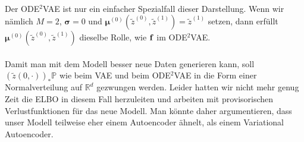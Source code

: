 \documentclass[12pt]{article}
\newcommand{\R}{\mathbb{R}}
\newcommand{\tz}{\widetilde{z}}
\newcommand{\bP}{\mathbb{P}}
\newcommand{\bbf}{\bold{f}}
\newcommand{\bmu}{\bm{\mu}}
\newcommand{\bsig}{\bm{\sigma}}
\begin{document}
	\\
	Der ODE$^2$VAE ist nur ein einfacher Spezialfall dieser Darstellung. Wenn wir nämlich $M=2$, $\bsig = 0$ und $\bmu^{(0)}(\tz^{(0)},\tz^{(1)}) = \tz^{(1)}$ setzen, dann erfüllt $\bmu^{(0)}(\tz^{(0)},\tz^{(1)})$ dieselbe Rolle, wie $\bbf$ im ODE$^2$VAE.\\
	\\
	Damit man mit dem Modell besser neue Daten generieren kann, soll $(\tz(0,\cdot))_*\bP$ wie beim VAE und beim ODE$^2$VAE in die Form einer Normalverteilung auf $\R^d$ gezwungen werden. Leider hatten wir nicht mehr genug Zeit die ELBO in diesem Fall herzuleiten und arbeiten mit provisorischen Verlustfunktionen für das neue Modell.
	Man könnte daher argumentieren, dass unser Modell teilweise eher einem Autoencoder ähnelt, als einem Variational Autoencoder.






	\newpage
\end{document}
